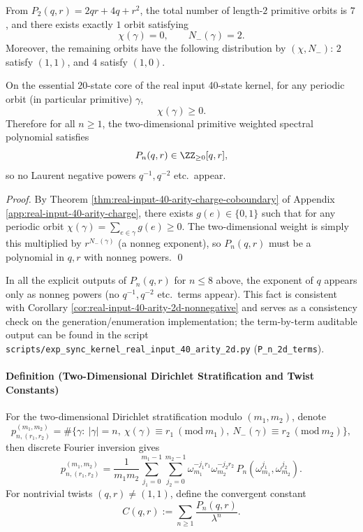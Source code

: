 \begin{corollary}\label{cor:real-input-40-arity-2d-rigidity-n2}
From \(P_2(q,r)=2qr+4q+r^{2}\), the total number of length-$2$ primitive orbits is $7$, and there exists exactly $1$ orbit satisfying
\[
\chi(\gamma)=0,\qquad N_-(\gamma)=2.
\]
Moreover, the remaining orbits have the following distribution by \((\chi,N_-)\): $2$ satisfy \((1,1)\), and $4$ satisfy \((1,0)\).
\end{corollary}

\begin{corollary}\label{cor:real-input-40-arity-2d-nonnegative}
On the essential $20$-state core of the real input 40-state kernel, for any periodic orbit (in particular primitive) \(\gamma\),
\[
\chi(\gamma)\ge 0.
\]
Therefore for all \(n\ge 1\), the two-dimensional primitive weighted spectral polynomial satisfies
\[
P_n(q,r)\in\ZZ_{\ge 0}[q,r],
\]
so no Laurent negative powers \(q^{-1},q^{-2}\) etc.\ appear.
\end{corollary}

\begin{proof}
By Theorem \ref{thm:real-input-40-arity-charge-coboundary} of Appendix \ref{app:real-input-40-arity-charge}, there exists \(g(e)\in\{0,1\}\) such that for any periodic orbit
\(\chi(\gamma)=\sum_{e\in\gamma}g(e)\ge 0\).
The two-dimensional weight is simply this multiplied by \(r^{N_-(\gamma)}\) (a nonneg exponent), so \(P_n(q,r)\) must be a polynomial in $q,r$ with nonneg powers. \qed
\end{proof}

\begin{remark}\label{rem:real-input-40-arity-2d-nonneg-evidence}
In all the explicit outputs of \(P_n(q,r)\) for \(n\le 8\) above, the exponent of \(q\) appears only as nonneg powers (no \(q^{-1},q^{-2}\) etc.\ terms appear).
This fact is consistent with Corollary \ref{cor:real-input-40-arity-2d-nonnegative} and serves as a consistency check on the generation/enumeration implementation;
the term-by-term auditable output can be found in the script \texttt{scripts/exp\_sync\_kernel\_real\_input\_40\_arity\_2d.py} (\texttt{P\_n\_2d\_terms}).
\end{remark}
\paragraph{Definition (Two-Dimensional Dirichlet Stratification and Twist Constants)}
For the two-dimensional Dirichlet stratification modulo $(m_1,m_2)$, denote
\[
p_{n,(r_1,r_2)}^{(m_1,m_2)}
=\#\{\gamma:\ |\gamma|=n,\ \chi(\gamma)\equiv r_1\ (\mathrm{mod}\ m_1),\ N_-(\gamma)\equiv r_2\ (\mathrm{mod}\ m_2)\},
\]
then discrete Fourier inversion gives
\[
p_{n,(r_1,r_2)}^{(m_1,m_2)}
=\frac{1}{m_1m_2}\sum_{j_1=0}^{m_1-1}\sum_{j_2=0}^{m_2-1}
\omega_{m_1}^{-j_1r_1}\omega_{m_2}^{-j_2r_2}\,P_n(\omega_{m_1}^{j_1},\omega_{m_2}^{j_2}).
\]
For nontrivial twists $(q,r)\neq(1,1)$, define the convergent constant
\[
C(q,r):=\sum_{n\ge 1}\frac{P_n(q,r)}{\lambda^n}.
\]
